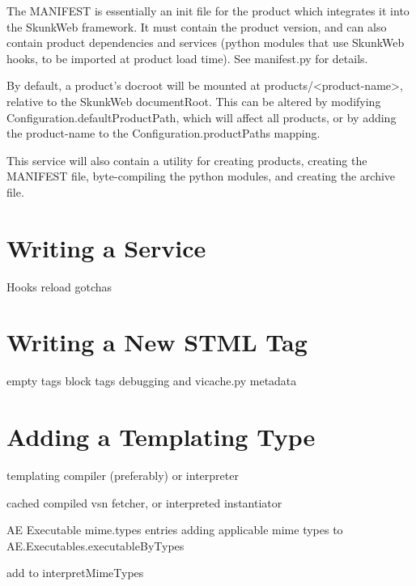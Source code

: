 \documentclass{manual}
\begin{document}
The MANIFEST is essentially an init file for the product which
integrates it into the SkunkWeb framework.  It must contain the
product version, and can also contain product dependencies and
services (python modules that use SkunkWeb hooks, to be imported at
product load time).  See manifest.py for details.

By default, a product's docroot will be mounted at
products/<product-name>, relative to the SkunkWeb documentRoot.  This
can be altered by modifying Configuration.defaultProductPath, which
will affect all products, or by adding the product-name to the
Configuration.productPaths mapping.

This service will also contain a utility for creating products, creating
the MANIFEST file, byte-compiling the python modules, and creating the
archive file.



\chapter{Writing a Service}
   Hooks
   reload gotchas

\chapter{Writing a New STML Tag}
   empty tags
   block tags
   debugging and vicache.py
   metadata

\chapter{Adding a Templating Type}
templating compiler (preferably) or interpreter

cached compiled vsn fetcher, or interpreted instantiator

AE Executable
mime.types entries
adding applicable mime types to AE.Executables.executableByTypes

add to interpretMimeTypes
\end{document}
